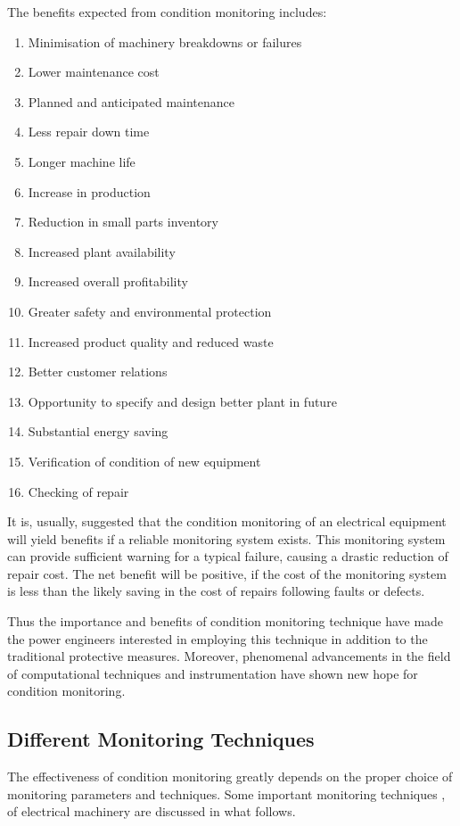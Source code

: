 \documentclass[a4paper,11pt]{article}
\begin{document}
The benefits expected from condition monitoring includes: 
\begin{enumerate}
\item Minimisation of machinery breakdowns or failures
\item Lower maintenance cost
\item Planned and anticipated maintenance
\item Less repair down time
\item Longer machine life
\item Increase in production
\item Reduction in small parts inventory
\item Increased plant availability
\item Increased overall profitability
\item Greater safety and environmental protection
\item Increased product quality and reduced waste
\item Better customer relations
\item Opportunity to specify and design better plant in future
\item Substantial energy saving
\item Verification of condition of new equipment
\item Checking of repair
\end{enumerate}

It is, usually, suggested that the condition monitoring of an electrical equipment will yield benefits if a reliable monitoring system exists. This monitoring system can provide sufficient warning for a typical failure, causing a drastic reduction of repair cost. The net benefit will be positive, if the cost of the monitoring system is less than the likely saving in the cost of repairs following faults or defects.

Thus the importance and benefits of condition monitoring technique have made the power engineers interested in employing this technique in addition to the traditional protective measures. Moreover, phenomenal advancements in the field of computational techniques and instrumentation have shown new hope for condition monitoring.

\subsection{Different Monitoring Techniques}
The effectiveness of condition monitoring greatly depends on the proper choice of monitoring parameters and techniques. Some important monitoring techniques \cite{Penman},\cite{rps1} of electrical machinery are discussed in what follows.
\end{document}
